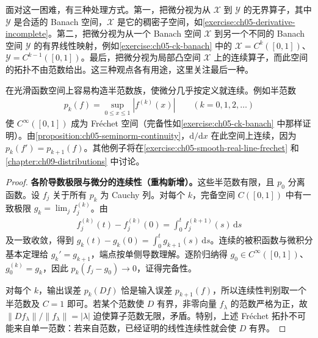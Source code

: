 \documentclass[../../main.tex]{subfiles}
\begin{document}
面对这一困难，有三种处理方式。第一，把微分视为从 $\mathcal X$ 到 $\mathcal Y$ 的无界算子，其中 $\mathcal Y$ 是合适的 Banach 空间，$\mathcal X$ 是它的稠密子空间，如\cref{exercise:ch05-derivative-incomplete}。第二，把微分视为从一个 Banach 空间 $\mathcal X$ 到另一个不同的 Banach 空间 $\mathcal Y$ 的有界线性映射，例如\cref{exercise:ch05-ck-banach} 中的 $\mathcal X=C^k([0,1])$、$\mathcal Y=C^{k-1}([0,1])$。最后，把微分视为局部凸空间 $\mathcal X$ 上的连续算子，而此空间的拓扑不由范数给出。这三种观点各有用途，这里关注最后一种。
\begin{example}\label{example:ch05-smooth-frechet}
在光滑函数空间上容易构造半范数族，使微分几乎按定义就连续。例如半范数
\begin{align*}
p_k(f)=\sup_{0\le x\le1}|f^{(k)}(x)|\qquad(k=0,1,2,\ldots)
\end{align*}
使 $C^\infty([0,1])$ 成为 Fr\'echet 空间（完备性如\cref{exercise:ch05-ck-banach} 中那样证明）。由\cref{proposition:ch05-seminorm-continuity}，$\mathrm d/\mathrm dx$ 在此空间上连续，因为 $p_k(f')=p_{k+1}(f)$。其他例子将在\cref{exercise:ch05-smooth-real-line-frechet} 和\cref{chapter:ch09-distributions} 中讨论。
\end{example}
\begin{proof}
\textbf{各阶导数极限与微分的连续性（重构新增）。}这些半范数有限，且 $p_0$ 分离函数。设 $f_j$ 关于所有 $p_k$ 为 Cauchy 列。对每个 $k$，完备空间 $C([0,1])$ 中有一致极限 $g_k=\lim_j f_j^{(k)}$。由
\begin{align*}
f_j^{(k)}(t)-f_j^{(k)}(0)=\int_0^t f_j^{(k+1)}(s)\,\mathrm ds
\end{align*}
及一致收敛，得到 $g_k(t)-g_k(0)=\int_0^t g_{k+1}(s)\,\mathrm ds$。连续的被积函数与微积分基本定理给 $g_k'=g_{k+1}$，端点按单侧导数理解。逐阶归纳得 $g_0\in C^\infty([0,1])$、$g_0^{(k)}=g_k$，因此 $p_k(f_j-g_0)\to0$，证得完备性。

对每个 $k$，输出误差 $p_k(Df)$ 恰是输入误差 $p_{k+1}(f)$，所以连续性判别取一个半范数及 $C=1$ 即可。若某个范数使 $D$ 有界，非零向量 $f_\lambda$ 的范数严格为正，故 $\|Df_\lambda\|/\|f_\lambda\|=|\lambda|$ 迫使算子范数无限，矛盾。特别，上述 Fr\'echet 拓扑不可能来自单一范数：若来自范数，已经证明的线性连续性就会使 $D$ 有界。
\end{proof}
\end{document}

